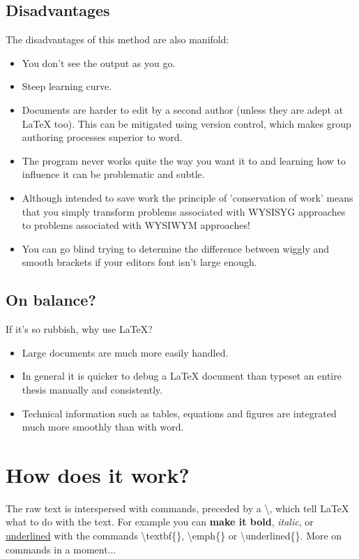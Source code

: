 \subsection{Disadvantages}
The disadvantages of this method are also manifold:
\begin{itemize}
\item You don't see the output as you go.
\item Steep learning curve.
\item Documents are harder to edit by a second author (unless they are adept at LaTeX too). This can be mitigated using version control, which makes group authoring processes superior to word.
\item The program never works quite the way you want it to and learning how to influence it can be problematic and subtle.
\item Although intended to save work the principle of 'conservation of work' means that you simply transform problems associated with WYSISYG approaches to problems associated with WYSIWYM approaches!
\item You can go blind trying to determine the difference between wiggly and smooth brackets if your editors font isn't large enough.
\end{itemize}

\subsection{On balance?}
If it's so rubbish, why use LaTeX?

\begin{itemize}
\item Large documents are much more easily handled. 
\item In general it is quicker to debug a LaTeX document than typeset an entire thesis manually and consistently.
\item Technical information such as tables, equations and figures are integrated much more smoothly than with word.
\end{itemize}

\section{How does it work?}

The raw text is interspersed with commands, preceded by a \textbackslash, which tell LaTeX what to do with the text. For example you can \textbf{make it bold}, \emph{italic}, or \underline{underlined} with the commands {\textbackslash}textbf\{\}, {\textbackslash}emph\{\} or {\textbackslash}underlined\{\}. More on commands in a moment...


